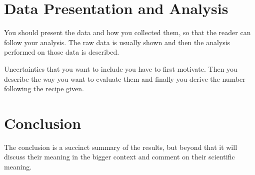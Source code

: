 \documentclass[12pt]{article}
\begin{document}
\section{Data Presentation and Analysis}

You should present the data and how you collected them, so that the reader can
follow your analysis. The raw data is usually shown and then the analysis
performed on those data is described.

Uncertainties that you want to include you have to first motivate. Then you
describe the way you want to evaluate them and finally you derive the number
following the recipe given.

\section{Conclusion}

The conclusion is a succinct summary of the results, but beyond that it will
discuss their meaning in the bigger context and comment on their scientific
meaning.
\end{document}
